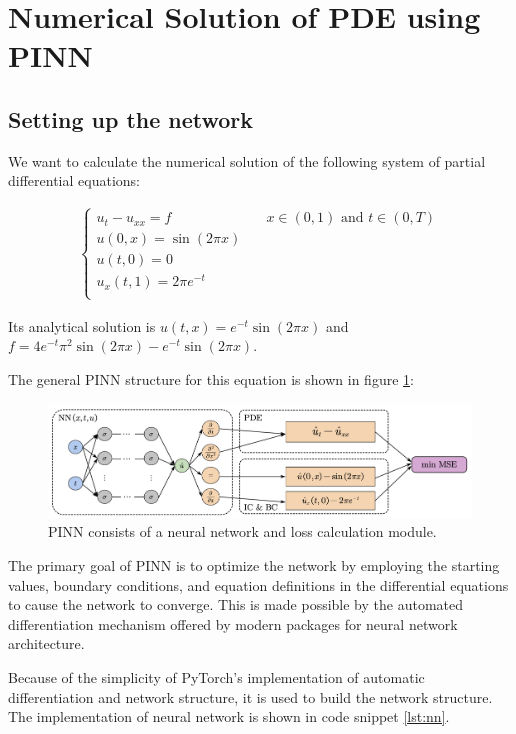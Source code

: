 \documentclass[10pt, a4paper]{article}
\begin{document}
\section{Numerical Solution of PDE using PINN}
\subsection{Setting up the network}
We want to calculate the numerical solution of the following system of partial differential equations:

\begin{align*}
    \begin{cases}
        u_t-u_{xx} = f& \quad x\in (0,1) \text{ and } t\in(0,T)\\
        u(0,x)=\sin (2 \pi x)&\\
        u(t,0)= 0&\\
        u_x(t,1) = 2\pi e^{-t}&\\
    \end{cases}
\end{align*}

Its analytical solution is $u(t,x)=e^{-t}\sin(2\pi x)$ and $f=4e^{-t}\pi^2\sin(2\pi x)-e^{-t}\sin(2\pi x)$.

The general PINN structure for this equation is shown in figure \ref{fig:PINN}:

\begin{figure}[htbp!]
    \includegraphics[width=\textwidth]{./pics/PINN.pdf}
    \caption{PINN consists of a neural network and loss calculation module.}
    \label{fig:PINN}
\end{figure}

The primary goal of PINN is to optimize the network by employing the starting values, boundary conditions, and equation definitions in the differential equations to cause the network to converge.
This is made possible by the automated differentiation mechanism offered by modern packages for neural network architecture.

Because of the simplicity of PyTorch's implementation of automatic differentiation and network structure, it is used to build the network structure. The implementation of neural network is shown in code snippet \ref{lst:nn}.
\end{document}
